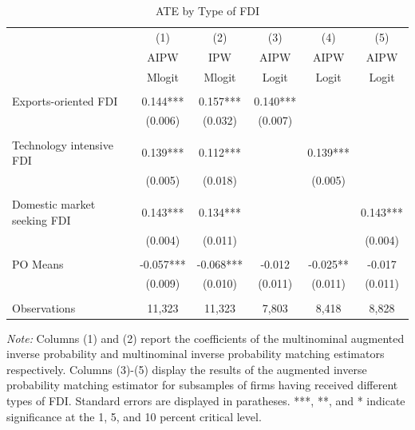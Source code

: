 \documentclass[a4paper,11pt]{scrartcl}
\begin{document}
\begin{table}[htbp]
	\centering
	\caption{ATE by Type of FDI}
	\label{tab:bytype}
\begin{threeparttable}

\begin{tabular}{lccccc} 
		\hline
		\hline
 	& (1) & (2) & (3) & (4) & (5) \\
	& AIPW & IPW  & AIPW  & AIPW & AIPW \\ 
	& Mlogit & Mlogit &Logit &Logit &Logit\\
		\hline
 			&  &  &  &  &   \\
Exports-oriented FDI 	& 0.144*** &   0.157*** & 0.140*** &  &  \\
 						& (0.006) &   (0.032) & (0.007) &  &\\ \\[-1.8ex]
Technology intensive FDI & 0.139***   & 0.112*** &  & 0.139*** &   \\
 						 & (0.005)  & (0.018) &  &  (0.005)&  \\ \\[-1.8ex]
Domestic market seeking FDI & 0.143*** &   0.134*** &  &  &0.143*** \\
 							& (0.004)   & (0.011) &  &  & (0.004)  \\ \\[-1.8ex]
PO Means 		&   -0.057*** &   -0.068*** &-0.012  &-0.025**  & -0.017    \\
 				&   (0.009) &   (0.010) &  (0.011)&(0.011)  & (0.011) \\ \\[-0.2em]
Observations 	& 11,323  & 11,323 &  7,803  & 8,418 & 8,828  \\ 
		\hline
		\hline
\end{tabular}

\begin{tablenotes} [flushleft]
\footnotesize
\item \textit{Note:} Columns (1) and (2) report the coefficients of the multinominal augmented inverse probability and multinominal inverse probability matching estimators respectively. Columns (3)-(5) display the results of the augmented inverse probability matching estimator for subsamples of firms having received different types of FDI. Standard errors are displayed in paratheses. ***, **, and * indicate significance at the 1, 5, and 10 percent critical level. 
\end{tablenotes}

\end{threeparttable}
\end{table}
\end{document}
